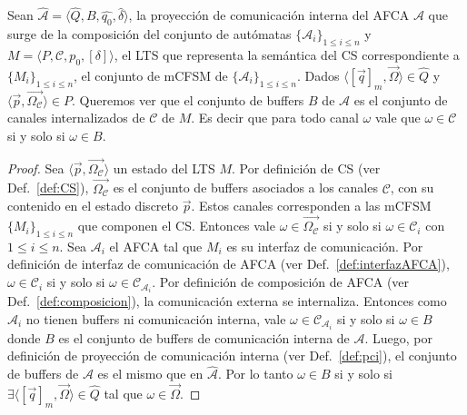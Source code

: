\begin{lemma}\label{lema2} Sean $\widehat{\mathcal{A}}=\langle \widehat{Q}, B, \widehat{q_0}, \widehat{\delta} \rangle$, la proyección de comunicación interna del AFCA $\mathcal{A}$ que surge de la composición del conjunto de autómatas  $\{\mathcal{A}_i\}_{1 \leq i \leq n}$  y $M= \langle P, \mathcal{C}, p_0, [\delta] \rangle$, el LTS que representa la semántica del CS correspondiente a $\{M_i\}_{1 \leq i \leq n}$, el conjunto de mCFSM de $\{\mathcal{A}_i\}_{1 \leq i \leq n}$. Dados $\langle [\overrightarrow{q}]_m, \overrightarrow{\Omega} \rangle \in \widehat{Q}$ y $\langle \overrightarrow{p}, \overrightarrow{\Omega_{\mathcal{C}}} \rangle \in P$. Queremos ver que el conjunto de buffers $B$ de $\mathcal{A}$ es el conjunto de canales internalizados de $\mathcal{C}$ de $M$. Es decir que para todo canal $\omega$ vale que $\omega \in \mathcal{C}$ si y solo si $\omega \in B$.
\end{lemma}
\begin{proof} Sea $\langle \overrightarrow{p}, \overrightarrow{\Omega_{\mathcal{C}}} \rangle$ un estado del LTS $M$. Por definición de CS (ver Def.~\ref{def:CS}), $\overrightarrow{\Omega_{\mathcal{C}}}$ es el conjunto de buffers asociados a los canales $\mathcal{C}$, con su contenido en el estado discreto $\overrightarrow{p}$. Estos canales corresponden a las mCFSM $\{M_i\}_{1 \leq i \leq n}$ que componen el CS. Entonces vale $\omega \in \overrightarrow{\Omega_{\mathcal{C}}}$ si y solo si $\omega \in \mathcal{C}_i$ con $1 \leq i \leq n$. Sea $\mathcal{A}_i$ el AFCA tal que $M_i$ es su interfaz de comunicación. Por definición de interfaz de comunicación de AFCA (ver Def.~\ref{def:interfazAFCA}), $\omega \in \mathcal{C}_i$ si y solo si $\omega \in {\mathcal{C}}_{\mathcal{A}_i}$. Por definición de composición de AFCA (ver Def.~\ref{def:composicion}), la comunicación externa se internaliza. Entonces como $\mathcal{A}_i$ no tienen buffers ni comunicación interna, vale $\omega \in {\mathcal{C}}_{\mathcal{A}_i}$ si y solo si $\omega \in B$ donde $B$ es el conjunto de buffers de comunicación interna de $\mathcal{A}$. Luego, por definición de proyección de comunicación interna (ver Def.~\ref{def:pci}), el conjunto de buffers de $\mathcal{A}$ es el mismo que en $\widehat{\mathcal{A}}$. Por lo tanto $\omega \in B$ si y solo si $\exists \langle [\overrightarrow{q}]_m, \overrightarrow{\Omega} \rangle \in \widehat{Q}$ tal que $\omega \in \overrightarrow{\Omega}$.
\end{proof}

